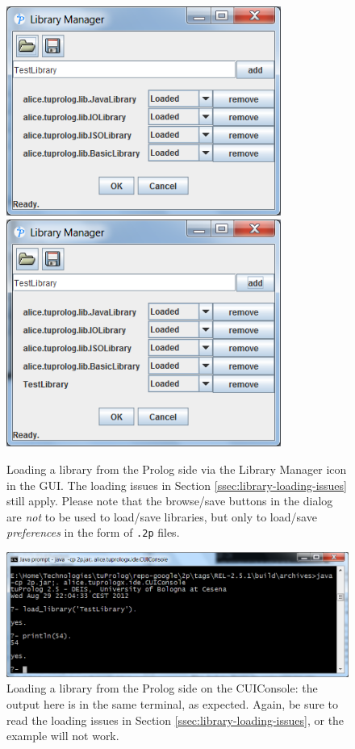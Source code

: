 \begin{figure}
    \centering
  \includegraphics[width=9cm]{images/TestLibrary1}
  \includegraphics[width=9cm]{images/TestLibrary2}
  \caption{Loading a library from the Prolog side via the Library Manager icon in the \tuprolog{} GUI. The loading issues in Section \ref{ssec:library-loading-issues} still apply. Please note that the browse/save buttons in the dialog are \textit{not} to be used to load/save libraries, but only to load/save \textit{\tuprolog{} preferences} in the form of \texttt{.2p} files.}
  \label{fig:testlibrary1}
\end{figure}
%
\begin{figure}
    \centering
  \includegraphics[width=12cm]{images/TestLibrary5}
  \caption{Loading a library from the Prolog side on the CUIConsole: the output here is in the same terminal, as expected. Again, be sure to read the loading issues in Section \ref{ssec:library-loading-issues}, or the example will not work.}
  \label{fig:testlibrary5}
\end{figure}


